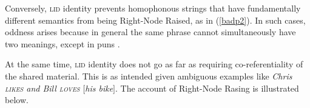 \documentclass[output=paper
                ,modfonts
                ,nonflat
	        ,collection
	        ,collectionchapter
	        ,collectiontoclongg
 	        ,biblatex
                ,babelshorthands
                ,newtxmath
                ,draftmode
                ,colorlinks, citecolor=brown
]{./langsci/langscibook}
\begin{document}
\noindent
Conversely, \textsc{lid} identity prevents homophonous strings that have fundamentally different semantics from being Right-Node Raised, as in (\ref{badp2}). In such cases,  oddness arises because in general the same phrase cannot simultaneously have  two meanings, except in puns  \citep[316]{zaenenkart}. 

\begin{exe}
\ex \begin{xlista} 
\end{xlista}\label{badp2}
\end{exe}

\noindent
At the same time, \textsc{lid} identity does
not go as far as requiring co-referentiality of the shared material. This is  as intended
given ambiguous examples like
{\it Chris \textsc{likes} and Bill \textsc{loves}  $[$his bike$]$}.
The account of Right-Node Rasing is illustrated below.
\end{document}
